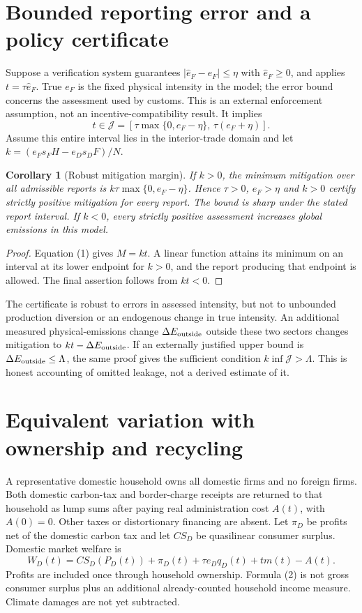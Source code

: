 \documentclass[11pt]{article}
\newtheorem{corollary}[theorem]{Corollary}
\begin{document}
\section{Bounded reporting error and a policy certificate}
Suppose a verification system guarantees
$|\widehat e_F-e_F|\leq\eta$ with $\widehat e_F\geq0$, and applies
$t=\tau\widehat e_F$. True $e_F$ is the fixed physical intensity in the
model; the error bound concerns the assessment used by customs. This is
an external enforcement assumption, not an incentive-compatibility result.
It implies
\[
 t\in\mathcal J=[\tau\max\{0,e_F-\eta\},\,\tau(e_F+\eta)].
\]
Assume this entire interval lies in the interior-trade domain and let
$k=(e_Fs_FH-e_Ds_DF)/N$.

\begin{corollary}[Robust mitigation margin]
If $k>0$, the minimum mitigation over all admissible reports is
$k\tau\max\{0,e_F-\eta\}$. Hence $\tau>0$, $e_F>\eta$ and $k>0$
certify strictly positive mitigation for every report. The bound is sharp
under the stated report interval. If $k<0$, every strictly positive
assessment increases global emissions in this model.
\end{corollary}
\begin{proof}
Equation (1) gives $M=kt$. A linear function attains its minimum on an
interval at its lower endpoint for $k>0$, and the report producing that
endpoint is allowed. The final assertion follows from $kt<0$.
\end{proof}

The certificate is robust to errors in assessed intensity, but not to
unbounded production diversion or an endogenous change in true intensity.
An additional measured physical-emissions change $\Delta E_{\rm outside}$
outside these two sectors changes mitigation to
$kt-\Delta E_{\rm outside}$. If an externally justified upper bound is
$\Delta E_{\rm outside}\leq\Lambda$, the same proof gives the sufficient
condition $k\inf\mathcal J>\Lambda$. This is honest accounting of omitted
leakage, not a derived estimate of it.

\section{Equivalent variation with ownership and recycling}
A representative domestic household owns all domestic firms and no
foreign firms. Both domestic carbon-tax and border-charge receipts are
returned to that household as lump sums after paying real administration
cost $A(t)$, with $A(0)=0$. Other taxes or distortionary financing are
absent. Let $\pi_D$ be profits net of the domestic carbon tax and let
$CS_D$ be quasilinear consumer surplus. Domestic market welfare is
\[
 W_D(t)=CS_D(P_D(t))+\pi_D(t)+\tau e_Dq_D(t)+tm(t)-A(t).
                                                               \tag{2}
\]
Profits are included once through household ownership. Formula (2) is
not gross consumer surplus plus an additional already-counted household
income measure. Climate damages are not yet subtracted.
\end{document}
